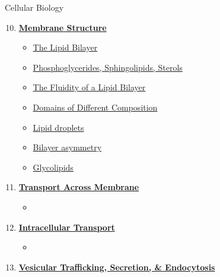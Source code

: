 \documentclass[12pt,letterpaper]{article}
\begin{document}

\begin{chapbox}{Cellular Biology}{ 
\begin{enumerate}[font=\bfseries, wide]
    \setcounter{enumi}{9}
    \item \hyperlink{10}{\textbf{Membrane Structure}}
    \begin{itemize}
        \item \hyperlink{10.1}{The Lipid Bilayer}
        \item \hyperlink{10.2}{Phosphoglycerides, Sphingolipids, Sterols}
        \item \hyperlink{10.3}{The Fluidity of a Lipid Bilayer}
        \item \hyperlink{10.4}{Domains of Different Composition}
        \item \hyperlink{10.5}{Lipid droplets}
        \item \hyperlink{10.6}{Bilayer asymmetry}
        \item \hyperlink{10.7}{Glycolipids}
    \end{itemize}
    \item \hyperlink{11}{\textbf{Transport Across Membrane}}
    \begin{itemize}
        \item
    \end{itemize}
    \item \hyperlink{12}{\textbf{Intracellular Transport}}
    \begin{itemize}
        \item 
    \end{itemize}
    \item \hyperlink{13}{\textbf{Vesicular Trafficking, Secretion, \& Endocytosis}}
    \begin{itemize}

\end{itemize}
\end{enumerate}}
\end{chapbox}
\end{document}
